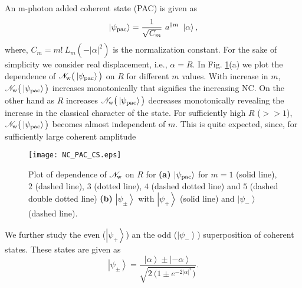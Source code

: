 \documentclass[letter,scriptaddress,twocolumn,prl,showkeys]{revtex4}
\newcommand{\ket}[1]{\left| #1 \right\rangle}
\begin{document}
An m-photon added coherent state (PAC) is given as
\begin{equation}
\ket{\psi_{\rm{pac}}}=\frac{1}{\sqrt{C_{m}}}~a^{\dagger m}~\ket\alpha,
\label{eq_psi_pac}
\end{equation}
where, $C_{m}=m!~L_{m}(-|\alpha|^{2})$ is the normalization constant.   
For the sake of simplicity we consider real displacement, i.e., $\alpha=R$. 
In Fig. \ref{fig_ncwe_pac_cs}(a) we plot the dependence of $\mathscr{N}_{\rm{w}}\big(\ket{\psi_{\rm{pac}}}\big)$ on $R$ for different $m$ values. 
With increase in $m$, $\mathscr{N}_{\rm{w}}\big(\ket{\psi_{\rm{pac}}}\big)$ increases monotonically that signifies the increasing NC.
On the other hand as $R$ increases $\mathscr{N}_{\rm{w}}\big(\ket{\psi_{\rm{pac}}}\big)$ decreases monotonically revealing the increase in the classical character of the state. 
For sufficiently high $R$ ($>>1$), $\mathscr{N}_{\rm{w}}\big(\ket{\psi_{\rm{pac}}}\big)$ becomes almost independent of $m$.
This is quite expected, since, for sufficiently large coherent amplitude  
\begin{figure}[h!]
\hspace*{-10pt}
\texttt{[image: NC\_PAC\_CS.eps]}
\caption{Plot of dependence of $\mathscr{N}_{\rm{w}}$ on $R$ for {\bf (a)} $\ket{\psi_{\rm{pac}}}$ for $m=1$ (solid line), $2$ (dashed line), $3$ (dotted line), $4$ (dashed dotted line) and $5$ (dashed double dotted line) {\bf (b)} $\ket{\psi_{\pm}}$ with $\ket{\psi_{+}}$ (solid line) and $\ket{\psi_{-}}$ (dashed line).}
\label{fig_ncwe_pac_cs}
\end{figure}

We further study the even ($\ket{\psi_{+}}$) an the odd ($\ket{\psi_{-}}$) superposition of coherent states. 
These states are given as
\begin{equation}
\ket{\psi_{\pm}}=\frac{\ket\alpha \pm \ket{-\alpha}}{\sqrt{2~\big(1 \pm e^{-2|\alpha|^{2}} \big)}}.
\label{eq_psi_cs}
\end{equation}
\end{document}
